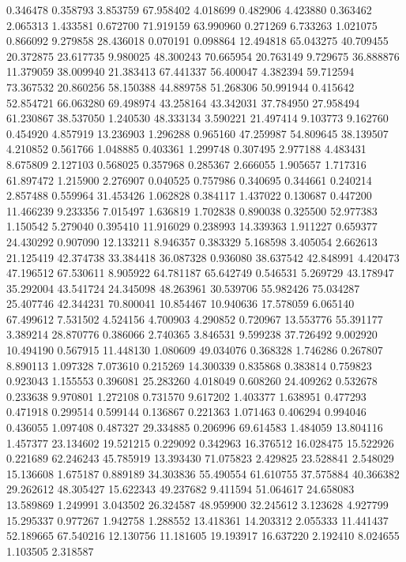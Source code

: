 0.346478
0.358793
3.853759
67.958402
4.018699
0.482906
4.423880
0.363462
2.065313
1.433581
0.672700
71.919159
63.990960
0.271269
6.733263
1.021075
0.866092
9.279858
28.436018
0.070191
0.098864
12.494818
65.043275
40.709455
20.372875
23.617735
9.980025
48.300243
70.665954
20.763149
9.729675
36.888876
11.379059
38.009940
21.383413
67.441337
56.400047
4.382394
59.712594
73.367532
20.860256
58.150388
44.889758
51.268306
50.991944
0.415642
52.854721
66.063280
69.498974
43.258164
43.342031
37.784950
27.958494
61.230867
38.537050
1.240530
48.333134
3.590221
21.497414
9.103773
9.162760
0.454920
4.857919
13.236903
1.296288
0.965160
47.259987
54.809645
38.139507
4.210852
0.561766
1.048885
0.403361
1.299748
0.307495
2.977188
4.483431
8.675809
2.127103
0.568025
0.357968
0.285367
2.666055
1.905657
1.717316
61.897472
1.215900
2.276907
0.040525
0.757986
0.340695
0.344661
0.240214
2.857488
0.559964
31.453426
1.062828
0.384117
1.437022
0.130687
0.447200
11.466239
9.233356
7.015497
1.636819
1.702838
0.890038
0.325500
52.977383
1.150542
5.279040
0.395410
11.916029
0.238993
14.339363
1.911227
0.659377
24.430292
0.907090
12.133211
8.946357
0.383329
5.168598
3.405054
2.662613
21.125419
42.374738
33.384418
36.087328
0.936080
38.637542
42.848991
4.420473
47.196512
67.530611
8.905922
64.781187
65.642749
0.546531
5.269729
43.178947
35.292004
43.541724
24.345098
48.263961
30.539706
55.982426
75.034287
25.407746
42.344231
70.800041
10.854467
10.940636
17.578059
6.065140
67.499612
7.531502
4.524156
4.700903
4.290852
0.720967
13.553776
55.391177
3.389214
28.870776
0.386066
2.740365
3.846531
9.599238
37.726492
9.002920
10.494190
0.567915
11.448130
1.080609
49.034076
0.368328
1.746286
0.267807
8.890113
1.097328
7.073610
0.215269
14.300339
0.835868
0.383814
0.759823
0.923043
1.155553
0.396081
25.283260
4.018049
0.608260
24.409262
0.532678
0.233638
9.970801
1.272108
0.731570
9.617202
1.403377
1.638951
0.477293
0.471918
0.299514
0.599144
0.136867
0.221363
1.071463
0.406294
0.994046
0.436055
1.097408
0.487327
29.334885
0.206996
69.614583
1.484059
13.804116
1.457377
23.134602
19.521215
0.229092
0.342963
16.376512
16.028475
15.522926
0.221689
62.246243
45.785919
13.393430
71.075823
2.429825
23.528841
2.548029
15.136608
1.675187
0.889189
34.303836
55.490554
61.610755
37.575884
40.366382
29.262612
48.305427
15.622343
49.237682
9.411594
51.064617
24.658083
13.589869
1.249991
3.043502
26.324587
48.959900
32.245612
3.123628
4.927799
15.295337
0.977267
1.942758
1.288552
13.418361
14.203312
2.055333
11.441437
52.189665
67.540216
12.130756
11.181605
19.193917
16.637220
2.192410
8.024655
1.103505
2.318587
